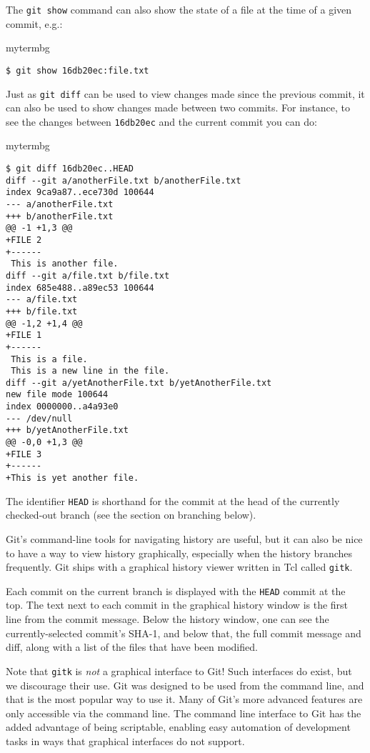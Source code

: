 The \texttt{git show} command can also show the state of a file at the time of
a given commit, e.g.:

\begin{tsession}{mytermbg}
\begin{verbatim}
$ git show 16db20ec:file.txt
\end{verbatim}
\end{tsession}

Just as \texttt{git diff} can be used to view changes made since the previous
commit, it can also be used to show changes made between two commits.  For
instance, to see the changes between \texttt{16db20ec} and the current commit
you can do:

\begin{tsession}{mytermbg}
\begin{verbatim}
$ git diff 16db20ec..HEAD
diff --git a/anotherFile.txt b/anotherFile.txt
index 9ca9a87..ece730d 100644
--- a/anotherFile.txt
+++ b/anotherFile.txt
@@ -1 +1,3 @@
+FILE 2
+------
 This is another file.
diff --git a/file.txt b/file.txt
index 685e488..a89ec53 100644
--- a/file.txt
+++ b/file.txt
@@ -1,2 +1,4 @@
+FILE 1
+------
 This is a file.
 This is a new line in the file.
diff --git a/yetAnotherFile.txt b/yetAnotherFile.txt
new file mode 100644
index 0000000..a4a93e0
--- /dev/null
+++ b/yetAnotherFile.txt
@@ -0,0 +1,3 @@
+FILE 3
+------
+This is yet another file.
\end{verbatim}
\end{tsession}

The identifier \texttt{HEAD} is shorthand for the commit at the head of the
currently checked-out branch (see the section on branching below).

Git's command-line tools for navigating history are useful, but it can also be
nice to have a way to view history graphically, especially when the history
branches frequently.  Git ships with a graphical history viewer written in Tcl
called \texttt{gitk}.


Each commit on the current branch is displayed with the \texttt{HEAD} commit at
the top.  The text next to each commit in the graphical history window is the
first line from the commit message.  Below the history window, one can see the
currently-selected commit's SHA-1, and below that, the full commit message and
diff, along with a list of the files that have been modified.

Note that \texttt{gitk} is \emph{not} a graphical interface to Git!  Such
interfaces do exist, but we discourage their use.  Git was designed to be used
from the command line, and that is the most popular way to use it.  Many of
Git's more advanced features are only accessible via the command line.  The
command line interface to Git has the added advantage of being scriptable,
enabling easy automation of development tasks in ways that graphical interfaces
do not support.

